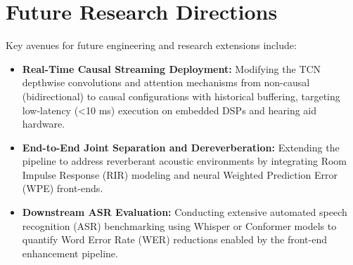\documentclass[11pt,a4paper]{report}
\begin{document}
\section{Future Research Directions}
Key avenues for future engineering and research extensions include:
\begin{itemize}
    \item \textbf{Real-Time Causal Streaming Deployment:} Modifying the TCN depthwise convolutions and attention mechanisms from non-causal (bidirectional) to causal configurations with historical buffering, targeting low-latency (<10 ms) execution on embedded DSPs and hearing aid hardware.
    \item \textbf{End-to-End Joint Separation and Dereverberation:} Extending the pipeline to address reverberant acoustic environments by integrating Room Impulse Response (RIR) modeling and neural Weighted Prediction Error (WPE) front-ends.
    \item \textbf{Downstream ASR Evaluation:} Conducting extensive automated speech recognition (ASR) benchmarking using Whisper or Conformer models to quantify Word Error Rate (WER) reductions enabled by the front-end enhancement pipeline.
\end{itemize}
\end{document}
